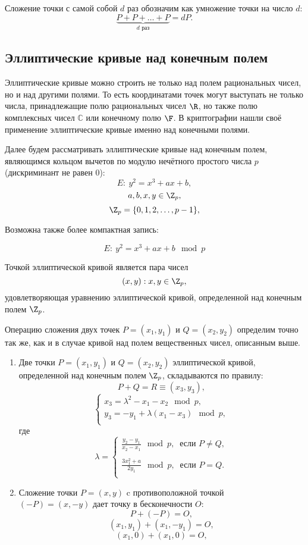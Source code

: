 Сложение точки с самой собой $d$ раз обозначим как умножение точки на число $d$:
    \[ \underbrace{P + P + \ldots + P}_{d \text{ раз}} = d P. \]


\subsection{Эллиптические кривые над конечным полем}

Эллиптические кривые можно строить не только над полем рациональных чисел, но и над другими полями. То есть координатами точек могут выступать не только числа, принадлежащие полю рациональных чисел $\R$, но также полю комплексных чисел $\mathbb{C}$ или конечному полю $\F$. В криптографии нашли своё применение эллиптические кривые именно над конечными полями.

Далее будем рассматривать эллиптические кривые над конечным полем, являющимся кольцом вычетов по модулю нечётного простого числа $p$ (дискриминант не равен 0):
    \[ E: ~ y^2 = x^3 + a x + b, \]
    \[ a, b, x, y \in \Z_p, \]
    \[ \Z_p = \{0, 1, 2,  \ldots,  p-1\},\]

Возможна также более компактная запись:

    \[ E: ~ y^2 = x^3 + a x + b \mod p\]

Точкой эллиптической кривой является пара чисел
    \[ (x,y): x, y \in \Z_p, \]
удовлетворяющая уравнению эллиптической кривой, определенной над конечным полем $\Z_p$.

Операцию сложения двух точек $P = (x_1, y_1)$ и $Q = (x_2, y_2)$ определим точно так же, как и в случае кривой над полем вещественных чисел, описанным выше.

\begin{enumerate}
    \item Две точки $P = (x_1, y_1)$ и $Q = (x_2, y_2)$ эллиптической кривой, определенной над конечным полем $\Z_p$, складываются по правилу:
        \[
            P + Q = R \equiv (x_3, y_3),
        \] \[
            \left\{ \begin{array}{l}
                x_3 = \lambda^2 - x_1 - x_2 \mod p,\\
                y_3 = - y_1 + \lambda (x_1 - x_3) \mod p,\\
            \end{array} \right.
        \]
        где
        \[
            \lambda = \left\{ \begin{array}{l}
                \frac{y_2 - y_1}{x_2 - x_1} \mod p, ~ \text{ если } P \ne Q, \\
                \\
                \frac{3 x_1^2 + a}{2 y_1} \mod p, ~ \text{ если } P = Q. \\
            \end{array} \right.
        \]
    \item Сложение точки $P=(x,y)$ c противоположной точкой \\
        $(-P) = (x,-y)$ дает точку в бесконечности $O$:
        \[ P + (-P) = O, \]
        \[ (x_1, y_1) + (x_1, -y_1) = O, \]
        \[ (x_1, 0) + (x_1, 0) = O, \]
\end{enumerate}

